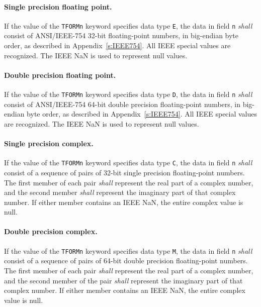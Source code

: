 \documentclass[onecolumn]{aa}
\begin{document}
    \paragraph{Single precision floating point.}
    If the value of the {\tt TFORMn} keyword 
    specifies data type {\tt E}, the data in 
    field {\tt n} {\em shall} consist of 
    ANSI/IEEE-754 \citep{ieee85} 32-bit floating-point 
    numbers, in big-endian byte order, as described in Appendix~\ref{s:IEEE754}.   
    All IEEE special values are recognized.
    The IEEE NaN is used to represent null values.

    \paragraph{Double precision floating point.}
    If the value of the {\tt TFORMn} keyword 
    specifies data type {\tt D}, the data in 
    field {\tt n} {\em shall} consist of ANSI/IEEE-754 \citep{ieee85} 
    64-bit double precision floating-point 
    numbers, in    big-endian byte order, as described in Appendix~\ref{s:IEEE754}.   
    All IEEE special values are recognized.
    The IEEE NaN is used to represent null values.

    \paragraph{Single precision complex.}
    If the value of the {\tt TFORMn} keyword 
    specifies data type {\tt C}, the data in 
    field {\tt n} {\em shall} consist of a sequence of pairs of 
    32-bit single precision 
    floating-point numbers.
    The first member of each pair {\em shall} represent the real part 
    of a complex number, and the second member 
    {\em shall} represent the imaginary part of that complex number.
    If either member contains an IEEE NaN, the entire complex value 
    is null.

    \paragraph{Double precision complex.}
    If the value of the {\tt TFORMn} keyword 
    specifies data type {\tt M}, the data in 
    field {\tt n} {\em shall} consist of a sequence of pairs of 
    64-bit double precision floating-point numbers.
    The first member of each pair {\em shall} represent the real part 
    of a complex number, and the second member of the pair 
    {\em shall} represent the imaginary part of that complex number.
    If either member contains an IEEE NaN, the entire complex value 
    is null.
\end{document}
